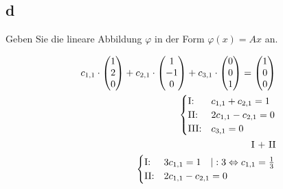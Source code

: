 \subsection{d}
Geben Sie die lineare Abbildung $\varphi$ in der Form $\varphi(x) = Ax$ an.

\begin{align*}
    c_{1,1} \cdot \begin{pmatrix}
                      1 \\ 2 \\ 0
                  \end{pmatrix} + c_{2, 1} \cdot \begin{pmatrix}
                                                     1 \\ -1 \\ 0
                                                 \end{pmatrix} + c_{3, 1} \cdot \begin{pmatrix}
                                                                                    0 \\ 0 \\ 1
                                                                                \end{pmatrix} = \begin{pmatrix}
                                                                                                    1 \\ 0 \\ 0
                                                                                                \end{pmatrix}  \\
    \begin{cases}
        \text{I:\@}   & c_{1,1} + c_{2,1} = 1  \\
        \text{II:\@}  & 2c_{1,1} - c_{2,1} = 0 \\
        \text{III:\@} & c_{3,1} = 0
    \end{cases}                                                                      \\
    \text{I + II}                                                                                               \\
    \begin{cases}
        \text{I:\@}   & 3c_{1,1}  = 1 \quad | : 3 \Leftrightarrow c_{1,1} = \frac{1}{3} \\
        \text{II:\@}  & 2c_{1,1} - c_{2,1} = 0                                          \\

\end{cases}
\end{align*}
